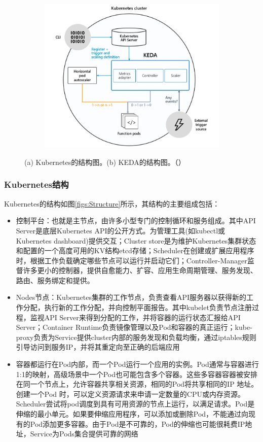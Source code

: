\documentclass[11pt]{article}
\begin{document}
\begin{figure}[!htbp]
\begin{subfigure}[b]{0.62\linewidth}
		\includegraphics[width=\linewidth]{figs/KEDA}
		\caption{}
		\label{figs:KEDA}
	\end{subfigure}
	\caption{(a) Kubernetes的结构图。(b) KEDA的结构图。（\cite{Kubernetes}）}
\end{figure}

\subsubsection{Kubernetes结构}
Kubernetes的结构如图\ref{figs:Structure}所示，其结构的主要组成包括：
\begin{itemize}
	\item 控制平台：也就是主节点，由许多小型专门的控制循环和服务组成。其中API Server是底层Kubernetes API的公开方式。为管理工具(如kubectl或Kubernetes dashboard)提供交互；Cluster store是为维护Kubernetes集群状态和配置的一个高度可用的KV结构etcd存储；Scheduler在创建或扩展应用程序时，根据工作负载确定哪些节点可以运行并启动它们；Controller-Manager监督许多更小的控制器，提供自愈能力、扩容、应用生命周期管理、服务发现、路由、服务绑定和提供。
	\item Nodes节点：Kubernetes集群的工作节点，负责查看API服务器以获得新的工作分配，执行新的工作分配，并向控制平面报告。其中kubelet负责节点注册过程，监视API Server来得到分配的工作，并将容器的运行状态汇报给API Server；Container Runtime负责镜像管理以及Pod和容器的真正运行；kube-proxy负责为Service提供cluster内部的服务发现和负载均衡，通过iptables规则引导访问到服务IP，并将其重定向至正确的后端应用
	\item 容器都运行在Pod内部，而一个Pod运行一个应用的实例。Pod通常与容器进行1:1的映射，高级场景中一个Pod也可能包含多个容器。这些多容器容器被安排在同一个节点上，允许容器共享相关资源，相同的Pod将共享相同的IP 地址。创建一个Pod 时，可以定义资源请求来申请一定数量的CPU或内存资源。Scheduler尝试将pod调度到具有可用资源的节点上运行，以满足请求。Pod是伸缩的最小单元。如果要伸缩应用程序，可以添加或删除Pod，不能通过向现有的Pod添加更多容器。由于Pod是不可靠的，Pod的伸缩也可能很耗费IP地址，Service为Pods集合提供可靠的网络
\end{itemize}
\end{document}
